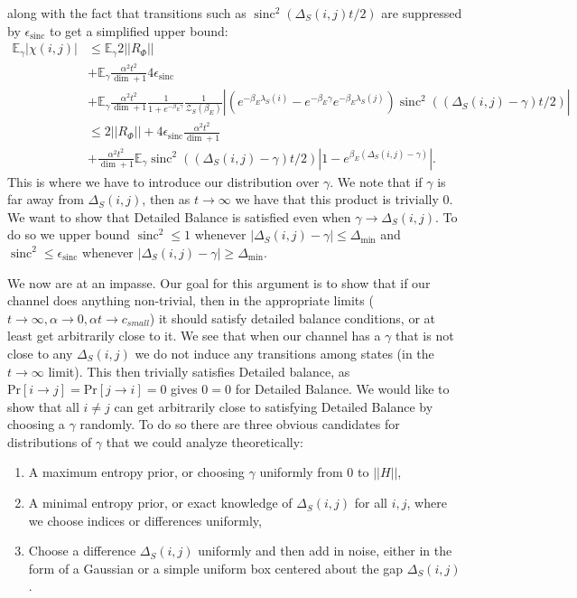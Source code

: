 \documentclass{article}
\newcommand{\parens}[1]{\left( #1 \right)}
\newcommand{\abs}[1]{\left| #1 \right|}
\newcommand{\norm}[1]{\left| \left| #1 \right| \right|}
\newcommand{\prob}[1]{\text{Pr}\left[ #1 \right]}
\newcommand{\partfun}{\mathcal{Z}}
\DeclareMathOperator{\sinc}{sinc}
\begin{document}
along with the fact that transitions such as $\sinc^2(\Delta_S(i,j)t/2)$ are suppressed by $\epsilon_{\sinc}$ to get a simplified upper bound:
\begin{align}
    \mathbb{E}_{\gamma} \abs{\chi(i,j)} &\leq \mathbb{E}_{\gamma} 2 \norm{R_{\Phi}} \nonumber \\
    &+ \mathbb{E}_{\gamma} \frac{\alpha^2 t^2}{\dim + 1} 4 \epsilon_{\sinc}  \nonumber \\
    &+ \mathbb{E}_{\gamma} \frac{\alpha^2 t^2}{\dim + 1} \frac{1}{1 + e^{-\beta_E \gamma}} \frac{1}{\partfun_S(\beta_E)} \abs{\parens{e^{-\beta_E \lambda_S(i)} - e^{-\beta_E \gamma} e^{-\beta_E \lambda_S(j)}} \sinc^2((\Delta_S(i,j) - \gamma) t/2)} \\
    &\leq 2 \norm{R_{\Phi}} + 4 \epsilon_{\sinc} \frac{\alpha^2 t^2}{\dim + 1} \nonumber \\
    &+ \frac{\alpha^2 t^2}{\dim + 1} \mathbb{E}_{\gamma} \sinc^2((\Delta_S(i,j) - \gamma) t/2) \abs{1 - e^{\beta_E (\Delta_S(i,j) - \gamma)}}. \label{eq:detailed_balance_upper_bound}
\end{align}
This is where we have to introduce our distribution over $\gamma$. We note that if $\gamma$ is far away from $\Delta_S(i,j)$, then as $t \to \infty$ we have that this product is trivially 0. We want to show that Detailed Balance is satisfied even when $\gamma \to \Delta_S(i,j)$. To do so we upper bound $\sinc^2 \leq 1$ whenever $\abs{\Delta_S(i,j) - \gamma} \leq \Delta_{\min}$ and $\sinc^2 \leq \epsilon_{\sinc}$ whenever $\abs{\Delta_S(i,j) - \gamma} \geq \Delta_{\min}$. 

We now are at an impasse. Our goal for this argument is to show that if our channel does anything non-trivial, then in the appropriate limits ($t \to \infty, \alpha \to 0, \alpha t \to c_{small}$) it should satisfy detailed balance conditions, or at least get arbitrarily close to it. We see that when our channel has a $\gamma$ that is not close to any $\Delta_S(i,j)$ we do not induce any transitions among states (in the $t \to \infty$ limit). This then trivially satisfies Detailed balance, as $\prob{i \to j} = \prob{j \to i} = 0$ gives $0 = 0$ for Detailed Balance. We would like to show that all $i \neq j$ can get arbitrarily close to satisfying Detailed Balance by choosing a $\gamma$ randomly. To do so there are three obvious candidates for distributions of $\gamma$ that we could analyze theoretically:
\begin{enumerate}
    \item A maximum entropy prior, or choosing $\gamma$ uniformly from 0 to $\norm{H}$,
    \item A minimal entropy prior, or exact knowledge of $\Delta_S(i,j)$ for all $i,j$, where we choose indices or differences uniformly,
    \item Choose a difference $\Delta_S(i,j)$ uniformly and then add in noise, either in the form of a Gaussian or a simple uniform box centered about the gap $\Delta_S(i,j)$.
\end{enumerate}
\end{document}
